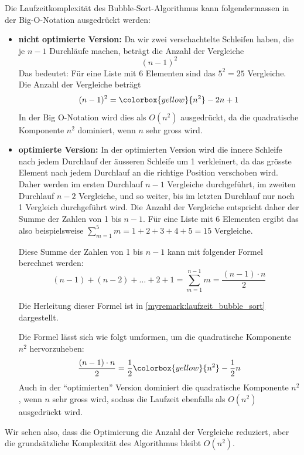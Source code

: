 \begin{myexample}
	Die Laufzeitkomplexität des Bubble-Sort-Algorithmus kann folgendermassen in der Big-O-Notation ausgedrückt werden:
	\begin{itemize}
		\item \textbf{nicht optimierte Version:} Da wir zwei verschachtelte Schleifen haben, die je \(n-1\) Durchläufe machen, beträgt die Anzahl der Vergleiche \[(n-1)^2\]
		      Das bedeutet: Für eine Liste mit 6 Elementen sind das \(5^2 = 25\) Vergleiche.
		      Die Anzahl der Vergleiche beträgt \[(n-1)^2 = \colorbox{yellow}{\ensuremath{n^2}} - 2n + 1\]
		      In der Big O-Notation wird dies als \(O(n^2)\) ausgedrückt, da die quadratische Komponente \(n^2\) dominiert, wenn \(n\) sehr gross wird.
		\item \textbf{optimierte Version:}
		      In der optimierten Version wird die innere Schleife nach jedem Durchlauf der äusseren Schleife um 1 verkleinert, da das grösste Element nach jedem Durchlauf an die richtige Position verschoben wird. Daher werden im ersten Durchlauf \(n-1\) Vergleiche durchgeführt, im zweiten Durchlauf \(n-2\) Vergleiche, und so weiter, bis im letzten Durchlauf nur noch 1 Vergleich durchgeführt wird. Die Anzahl der Vergleiche entspricht daher der Summe der Zahlen von 1 bis \(n-1\). Für eine Liste mit 6 Elementen ergibt das also beispielsweise \(\displaystyle\sum_{m=1}^{5} m = 1 + 2 + 3 + 4 + 5 = 15\) Vergleiche.

		      Diese Summe der Zahlen von 1 bis \(n-1\) kann mit folgender Formel berechnet werden:
		      \[
			      (n-1) + (n-2) + \ldots + 2 + 1 = \displaystyle\sum_{m=1}^{n-1} m = \frac{(n-1) \cdot n}{2}
		      \]

		      Die Herleitung dieser Formel ist in \cref{myremark:laufzeit_bubble_sort} dargestellt.


		      Die Formel lässt sich wie folgt umformen, um die quadratische Komponente \(n^2\) hervorzuheben:
		      \[\frac{(n-1) \cdot n}{2}  = \frac{1}{2}\colorbox{yellow}{\ensuremath{n^2}} - \frac{1}{2}n\]
		      Auch in der \enquote{optimierten} Version dominiert die quadratische Komponente \(n^2\), wenn \(n\) sehr gross wird, sodass die Laufzeit ebenfalls als \(O(n^2)\) ausgedrückt wird.
	\end{itemize}
	Wir sehen also, dass die Optimierung die Anzahl der Vergleiche reduziert, aber die grundsätzliche Komplexität des Algorithmus bleibt \(O(n^2)\).
\end{myexample}

